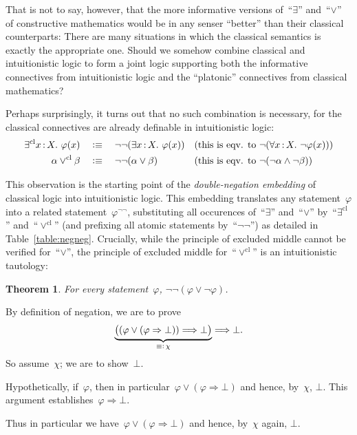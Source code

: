 \documentclass[10pt,reqno,a4paper,openany]{amsbook}
\makeatletter
\theoremstyle{definition}
\theoremstyle{plain}
\newtheorem{thm}[defn]{Theorem}
\theoremstyle{remark}
\newcommand{\?}{\,{:}\,}
\renewcommand{\_}{\mathpunct{.}\,}
\newcommand{\defequiv}{\vcentcolon\equiv}
\renewenvironment{proof}[1][\proofname]{\par
  \pushQED{\qed}%
  \normalfont \topsep6\p@\@plus6\p@\relax
  \trivlist
  \item[\hskip\labelsep
        \itshape
    #1\@addpunct{.}]\ignorespaces
}{%
  \popQED\endtrivlist\@endpefalse
}
\newcommand{\cl}{\mathrm{cl}}
\makeatother
\begin{document}
That is not to say, however, that the more informative versions of~``$\exists$''
and~``$\vee$'' of constructive mathematics would be in any senser ``better''
than their classical counterparts: There are many situations in which the
classical semantics is exactly the appropriate one. Should we somehow combine
classical and intuitionistic logic to form a joint logic supporting
both the informative connectives from intuitionistic logic and the ``platonic''
connectives from classical mathematics?

Perhaps surprisingly, it turns out that no such combination is necessary, for
the classical connectives are already definable in intuitionistic logic:
\begin{align*}
  \exists^\cl x \? X\_ \varphi(x)
    &\quad\defequiv\quad \neg\neg (\exists x\?X\_ \varphi(x))
    && \text{(this is eqv. to $\neg(\forall x\?X\_ \neg\varphi(x))$)} \\
  \alpha \vee^\cl \beta
    &\quad\defequiv\quad \neg\neg (\alpha \vee \beta)
    && \text{(this is eqv. to $\neg(\neg\alpha \wedge \neg\beta)$)}
\end{align*}

This observation is the starting point of the \emph{double-negation embedding}
of classical logic into intuitionistic logic. This embedding translates any
statement~$\varphi$ into a related statement~$\varphi^{\neg\neg}$, substituting
all occurences of~``$\exists$'' and~``$\vee$'' by~``$\exists^\cl$''
and~``$\vee^\cl$'' (and prefixing all atomic statements by~``$\neg\neg$'')
as detailed in Table~\ref{table:negneg}. Crucially, while the principle of
excluded middle cannot be verified for~``$\vee$'', the principle of excluded
middle for~``$\vee^\cl$'' is an intuitionistic tautology:

\begin{thm}For every statement~$\varphi$,
$\neg\neg(\varphi \vee \neg\varphi)$.
\end{thm}

\begin{proof}By definition of negation, we are to prove
\[ \underbrace{\bigl((\varphi \vee (\varphi\Rightarrow\bot)) \Longrightarrow
\bot\bigr)}_{\equiv\vcentcolon\, \chi}
\Longrightarrow \bot. \]
So assume~$\chi$; we are to show~$\bot$.

Hypothetically, if~$\varphi$, then in particular~$\varphi \vee
(\varphi\Rightarrow\bot)$ and hence, by~$\chi$, $\bot$. This argument
establishes~$\varphi \Rightarrow \bot$.

Thus in particular we have~$\varphi \vee (\varphi \Rightarrow \bot)$ and hence,
by~$\chi$ again, $\bot$.
\end{proof}
\end{document}
